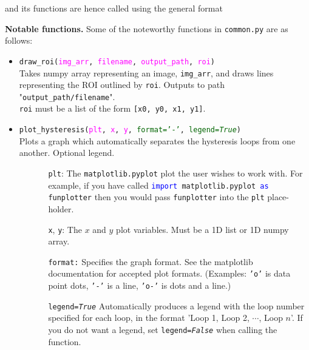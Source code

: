 
and its functions are hence called using the general format


\textbf{Notable functions.} Some of the noteworthy functions in \texttt{common.py} are as follows:

\begin{itemize}
	\item \texttt{draw\_roi(\textcolor{magenta}{img\_arr}, \textcolor{magenta}{filename}, \textcolor{magenta}{output\_path}, \textcolor{magenta}{roi})}\\
			Takes numpy array representing an image, \texttt{img\_arr}, and draws lines representing the ROI outlined by \texttt{roi}. Outputs to path "\texttt{output\_path/filename}".\\
			\tab{} \texttt{roi} must be a list of the form \texttt{[x0, y0, x1, y1]}.
	\item \texttt{plot\_hysteresis(\textcolor{magenta}{plt}, \textcolor{magenta}{x}, \textcolor{magenta}{y}, \textcolor{darkgreen}{format='-'}, \textcolor{darkgreen}{legend=\textit{True}})}\\
		Plots a graph which automatically separates the hysteresis loops from one another. Optional legend.
		\begin{itemize}
		\item[]	\begin{itemize}
				\item[\texttt{plt}:]
					The \texttt{matplotlib.pyplot} plot the user wishes to work with. For example, if you have called \texttt{\colorbox{lightergray}{\textcolor{blue}{import} matplotlib.pyplot \textcolor{blue}{as} funplotter}} then you would pass \texttt{funplotter} into the \texttt{plt} place-holder.
				\item[\texttt{x}, \texttt{y}:] 
					The $ x $ and $ y $ plot variables. Must be a 1D list or 1D numpy array.
				\item[\texttt{format:}] 
					Specifies the graph format. See the matplotlib documentation for accepted plot formats. (Examples: \texttt{'o'} is data point dots, \texttt{'-'} is a line, \texttt{'o-'} is dots and a line.)
				\item[\texttt{legend=\textit{True}}] 
					Automatically produces a legend with the loop number specified for each loop, in the format 'Loop 1, Loop 2, $ \cdots $, Loop $ n $'. If you do not want a legend, set \texttt{legend=\textit{False}} when calling the function.
			\end{itemize}
		\end{itemize}
		

\end{itemize}
